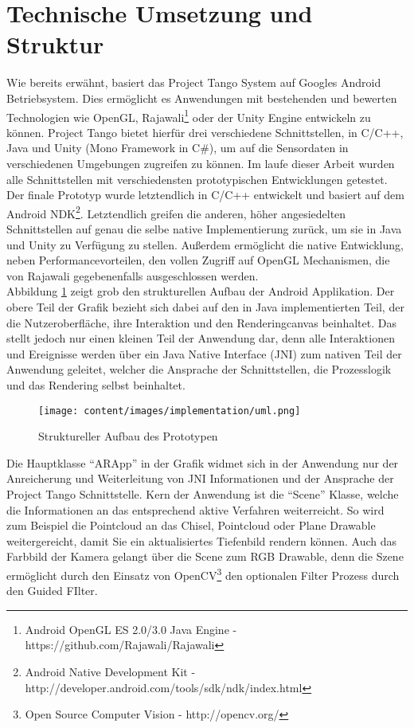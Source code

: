 \section{Technische Umsetzung und Struktur} \label{eq:technic}

Wie bereits erwähnt, basiert das Project Tango System auf Googles Android Betriebsystem. Dies ermöglicht es Anwendungen mit bestehenden und bewerten Technologien wie OpenGL, Rajawali\footnote{Android OpenGL ES 2.0/3.0 Java Engine - https://github.com/Rajawali/Rajawali} oder der Unity Engine entwickeln zu können. Project Tango bietet hierfür drei verschiedene Schnittstellen, in C/C++, Java und Unity (Mono Framework in C\#), um auf die Sensordaten in verschiedenen Umgebungen zugreifen zu können. Im laufe dieser Arbeit wurden alle Schnittstellen mit verschiedensten prototypischen Entwicklungen getestet.\\

Der finale Prototyp wurde letztendlich in C/C++ entwickelt und basiert auf dem Android NDK\footnote{Android Native Development Kit - http://developer.android.com/tools/sdk/ndk/index.html}. Letztendlich greifen die anderen, höher angesiedelten Schnittstellen auf genau die selbe native Implementierung zurück, um sie in Java und Unity zu Verfügung zu stellen. Außerdem ermöglicht die native Entwicklung, neben Performancevorteilen, den vollen Zugriff auf OpenGL Mechanismen, die von Rajawali gegebenenfalls ausgeschlossen werden.\\

Abbildung \ref{fig:structure} zeigt grob den strukturellen Aufbau der Android Applikation. Der obere Teil der Grafik bezieht sich dabei auf den in Java implementierten Teil, der die Nutzeroberfläche, ihre Interaktion und den Renderingcanvas beinhaltet. Das stellt jedoch nur einen kleinen Teil der Anwendung dar, denn alle Interaktionen und Ereignisse werden über ein Java Native Interface (JNI) zum nativen Teil der Anwendung geleitet, welcher die Ansprache der Schnittstellen, die Prozesslogik und das Rendering selbst beinhaltet. \\

\begin{figure}[h]
  \centering
	\texttt{[image: content/images/implementation/uml.png]} 
  \caption{Struktureller Aufbau des Prototypen}
  \label{fig:structure}
\end{figure}

Die Hauptklasse \enquote{ARApp} in der Grafik widmet sich in der Anwendung nur der Anreicherung und Weiterleitung von JNI Informationen und der Ansprache der Project Tango Schnittstelle. Kern der Anwendung ist die \enquote{Scene} Klasse, welche die Informationen an das entsprechend aktive Verfahren weiterreicht. So wird zum Beispiel die Pointcloud an das Chisel, Pointcloud oder Plane Drawable weitergereicht, damit Sie ein aktualisiertes Tiefenbild rendern können. Auch das Farbbild der Kamera gelangt über die Scene zum RGB Drawable, denn die Szene ermöglicht durch den Einsatz von OpenCV\footnote{Open Source Computer Vision - http://opencv.org/} den optionalen Filter Prozess durch den Guided FIlter.
